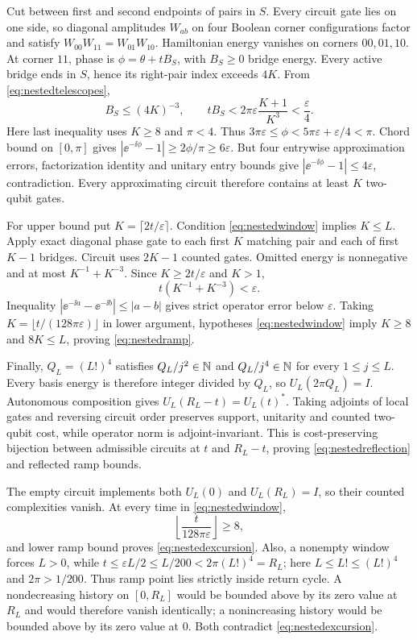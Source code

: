 Cut between first and second endpoints of pairs in $S$.  Every circuit gate
lies on one side, so diagonal amplitudes $W_{ab}$ on four Boolean corner
configurations factor and satisfy $W_{00}W_{11}=W_{01}W_{10}$.  Hamiltonian
energy vanishes on corners $00,01,10$.  At corner $11$, phase is
$\phi=\theta+tB_S$, with $B_S\ge0$ bridge energy.  Every active bridge ends
in $S$, hence its right-pair index exceeds $4K$.  From
\eqref{eq:nestedtelescopes},
\begin{equation}
 B_S\le(4K)^{-3},\qquad
 tB_S<2\pi\varepsilon\frac{K+1}{K^3}<\frac\varepsilon4.\label{eq:nestedbridge}
\end{equation}
Here last inequality uses $K\ge8$ and $\pi<4$.  Thus
$3\pi\varepsilon\le\phi<5\pi\varepsilon+\varepsilon/4<\pi$.
Chord bound on $[0,\pi]$ gives
$|\ee^{-\ii\phi}-1|\ge2\phi/\pi\ge6\varepsilon$.
But four entrywise approximation errors, factorization identity and unitary
entry bounds give $|\ee^{-\ii\phi}-1|\le4\varepsilon$, contradiction.  Every
approximating circuit therefore contains at least $K$ two-qubit gates.

For upper bound put $K=\lceil2t/\varepsilon\rceil$.  Condition
\eqref{eq:nestedwindow} implies $K\le L$.  Apply exact diagonal phase gate to
each first $K$ matching pair and each of first $K-1$ bridges.  Circuit uses
$2K-1$ counted gates.  Omitted energy is nonnegative and at most
$K^{-1}+K^{-3}$.  Since $K\ge2t/\varepsilon$ and $K>1$,
\begin{equation}
 t(K^{-1}+K^{-3})<\varepsilon.
\end{equation}
Inequality $|\ee^{-\ii a}-\ee^{-\ii b}|\le|a-b|$ gives strict operator error
below $\varepsilon$.  Taking
$K=\lfloor t/(128\pi\varepsilon)\rfloor$ in lower argument, hypotheses
\eqref{eq:nestedwindow} imply $K\ge8$ and $8K\le L$, proving
\eqref{eq:nestedramp}.

Finally, $Q_L=(L!)^4$ satisfies $Q_L/j^2\in\mathbb N$ and $Q_L/j^4\in\mathbb N$ for every
$1\le j\le L$.  Every basis energy is therefore integer divided by $Q_L$,
so $U_L(2\pi Q_L)=I$.  Autonomous composition gives
$U_L(R_L-t)=U_L(t)^*$.  Taking adjoints of local gates and reversing circuit
order preserves support, unitarity and counted two-qubit cost, while operator
norm is adjoint-invariant.  This is cost-preserving bijection between
admissible circuits at $t$ and $R_L-t$, proving
\eqref{eq:nestedreflection} and reflected ramp bounds.

The empty circuit implements both $U_L(0)$ and $U_L(R_L)=I$, so their
counted complexities vanish.  At every time in \eqref{eq:nestedwindow},
\[
 \left\lfloor\frac{t}{128\pi\varepsilon}\right\rfloor\ge8,
\]
and lower ramp bound proves \eqref{eq:nestedexcursion}.  Also, a nonempty
window forces $L>0$, while
$t\le\varepsilon L/2\le L/200<2\pi(L!)^4=R_L$; here
$L\le L!\le(L!)^4$ and $2\pi>1/200$.  Thus ramp point lies strictly inside
return cycle.  A nondecreasing
history on $[0,R_L]$ would be bounded above by its zero value at $R_L$ and
would therefore vanish identically; a nonincreasing history would be bounded
above by its zero value at $0$.  Both contradict
\eqref{eq:nestedexcursion}.

